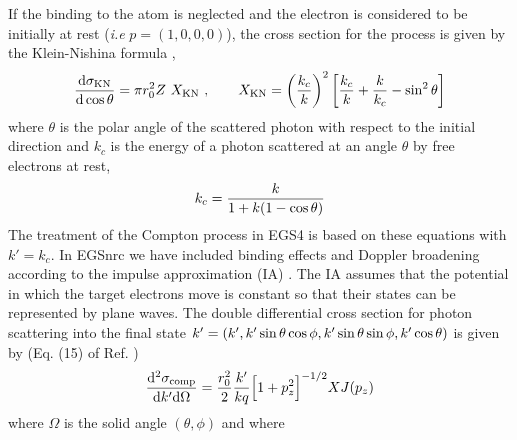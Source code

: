 If the binding to the atom is neglected and the electron
is considered to be initially at rest ({\em i.e} $p = (1,0,0,0)$),
the cross section for the process is given by the Klein-Nishina
formula \cite{KN29},
\begin{equation}
{{\rm d} \sigma_{\rm KN} \over {\rm d} \cos \theta} = \pi r_0^2 Z~
X_{\rm KN}~, \quad \quad X_{\rm KN} =
\left({k_c \over k} \right)^2
\left[ {k_c \over k} + {k \over k_c} - \sin^2 \theta \right]
\end{equation}
where $\theta$ is the polar angle of the scattered photon with
respect to the initial direction and $k_c$ is the energy
of a photon scattered at an angle $\theta$
by free electrons at rest,
\begin{equation}
k_c = {k \over 1 + k (1 - \cos \theta)}
\end{equation}
The treatment of the Compton process in EGS4 is based on these
equations with $k' = k_c$. In EGSnrc we have included binding effects and
Doppler broadening according to the impulse approximation (IA)
\cite{Ri75}. The IA assumes that the potential in which the
target electrons move is constant so that their states can
be represented by plane waves. The double differential
cross section for photon scattering into the final state
$k' = (k', k' \sin \theta \cos \phi, k' \sin \theta \sin \phi, \\
k' \cos \theta)$ is given by (Eq. (15) of Ref. \cite{RB82})
\begin{equation}
\label{comp_cs1}
{{\rm d}^2 \sigma_{\rm comp} \over {\rm d}k' {\rm d}\Omega} =
{r_0^2 \over 2} {k' \over k q} \Big[1 + p_z^2 \Big]^{-1/2} X J(p_z)
\end{equation}
where $\Omega$ is the solid angle $(\theta,\phi)$ and where
